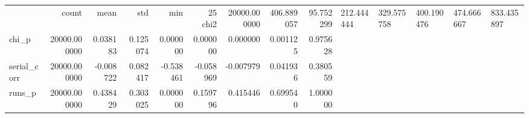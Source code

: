 \begin{tabular}{lrrrrrrrr}
\toprule
 & count & mean & std & min & 25%
\midrule
chi2 & 20000.000000 & 406.889057 & 95.752299 & 212.444444 & 329.575758 & 400.190476 & 474.666667 & 833.435897 \\
chi_p & 20000.000000 & 0.038183 & 0.125074 & 0.000000 & 0.000000 & 0.000000 & 0.001125 & 0.975628 \\
serial_corr & 20000.000000 & -0.008722 & 0.082417 & -0.538461 & -0.058969 & -0.007979 & 0.041936 & 0.380559 \\
runs_p & 20000.000000 & 0.438429 & 0.303025 & 0.000000 & 0.159796 & 0.415446 & 0.699540 & 1.000000 \\
\bottomrule
\end{tabular}
